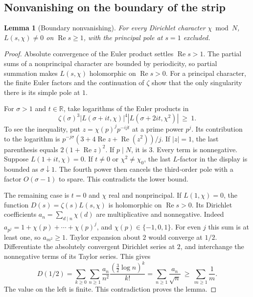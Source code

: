 \documentclass[a4paper,11pt]{article}
\newtheorem{lemma}[proposition]{Lemma}
\theoremstyle{definition}
\theoremstyle{remark}
\newcommand{\RR}{\mathbb R}\newcommand{\CC}{\mathbb C}\newcommand{\QQ}{\mathbb Q}
\newcommand{\real}{\operatorname{Re}}\newcommand{\imag}{\operatorname{Im}}
\numberwithin{equation}{section}
\begin{document}
\subsection{Nonvanishing on the boundary of the strip}\label{nav:I-03}
\label{sec:boundary}
\begin{lemma}[Boundary nonvanishing]\label{lem:boundary}
For every Dirichlet character \(\chi\bmod N\), \(L(s,\chi)\ne0\) on \(\real s\ge1\), with the principal pole at \(s=1\) excluded.
\end{lemma}
\begin{proof}
Absolute convergence of the Euler product settles \(\real s>1\). The partial sums of a nonprincipal character are bounded by periodicity, so partial summation makes \(L(s,\chi)\) holomorphic on \(\real s>0\). For a principal character, the finite Euler factors and the continuation of \(\zeta\) show that the only singularity there is its simple pole at \(1\).

For \(\sigma>1\) and \(t\in\RR\), take logarithms of the Euler products in
\[
       \zeta(\sigma)^3|L(\sigma+it,\chi)|^4
                             |L(\sigma+2it,\chi^2)|\ \ge\ 1 .
\]
To see the inequality, put \(z=\chi(p)^j p^{-ijt}\) at a prime power \(p^j\). Its contribution to the logarithm is
\(p^{-j\sigma}(3+4\real z+\real(z^2))/j\).
If \(|z|=1\), the last parenthesis equals \(2(1+\real z)^2\). If \(p\mid N\), it is \(3\). Every term is nonnegative. Suppose \(L(1+it,\chi)=0\). If \(t\ne0\) or \(\chi^2\ne\chi_0\), the last \(L\)-factor in the display is bounded as \(\sigma\downarrow1\). The fourth power then cancels the third-order pole with a factor \(O(\sigma-1)\) to spare. This contradicts the lower bound.

The remaining case is \(t=0\) and \(\chi\) real and nonprincipal. If \(L(1,\chi)=0\), the function \(D(s)=\zeta(s)L(s,\chi)\) is holomorphic on \(\real s>0\). Its Dirichlet coefficients \(a_n=\sum_{d\mid n}\chi(d)\) are multiplicative and nonnegative. Indeed \(a_{p^j}=1+\chi(p)+\cdots+\chi(p)^j\), and \(\chi(p)\in\{-1,0,1\}\). For even \(j\) this sum is at least one, so \(a_{m^2}\ge1\). Taylor expansion about \(2\) would converge at \(1/2\). Differentiate the absolutely convergent Dirichlet series at \(2\), and interchange the nonnegative terms of its Taylor series. This gives
\[
 D(1/2)
  =\sum_{k\ge0}\sum_{n\ge1}\frac{a_n}{n^2}
                         \frac{(\tfrac32\log n)^k}{k!}
  =\sum_{n\ge1}\frac{a_n}{\sqrt n}
  \ \ge\ \sum_{m\ge1}\frac1m .
\]
The value on the left is finite. This contradiction proves the lemma.
\end{proof}
\end{document}
